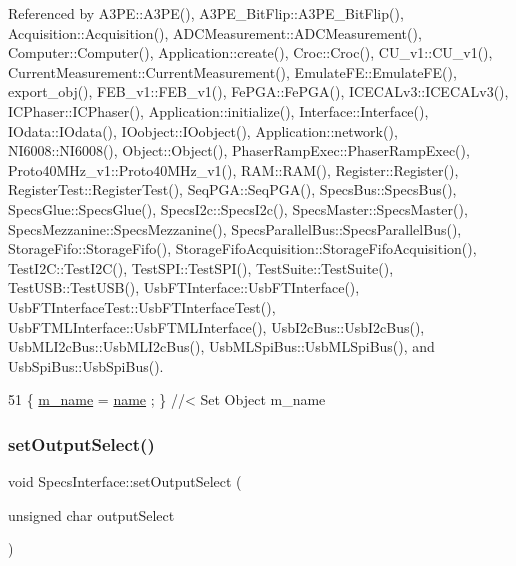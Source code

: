 Referenced by A3\+P\+E\+::\+A3\+P\+E(), A3\+P\+E\+\_\+\+Bit\+Flip\+::\+A3\+P\+E\+\_\+\+Bit\+Flip(), Acquisition\+::\+Acquisition(), A\+D\+C\+Measurement\+::\+A\+D\+C\+Measurement(), Computer\+::\+Computer(), Application\+::create(), Croc\+::\+Croc(), C\+U\+\_\+v1\+::\+C\+U\+\_\+v1(), Current\+Measurement\+::\+Current\+Measurement(), Emulate\+F\+E\+::\+Emulate\+F\+E(), export\+\_\+obj(), F\+E\+B\+\_\+v1\+::\+F\+E\+B\+\_\+v1(), Fe\+P\+G\+A\+::\+Fe\+P\+G\+A(), I\+C\+E\+C\+A\+Lv3\+::\+I\+C\+E\+C\+A\+Lv3(), I\+C\+Phaser\+::\+I\+C\+Phaser(), Application\+::initialize(), Interface\+::\+Interface(), I\+Odata\+::\+I\+Odata(), I\+Oobject\+::\+I\+Oobject(), Application\+::network(), N\+I6008\+::\+N\+I6008(), Object\+::\+Object(), Phaser\+Ramp\+Exec\+::\+Phaser\+Ramp\+Exec(), Proto40\+M\+Hz\+\_\+v1\+::\+Proto40\+M\+Hz\+\_\+v1(), R\+A\+M\+::\+R\+A\+M(), Register\+::\+Register(), Register\+Test\+::\+Register\+Test(), Seq\+P\+G\+A\+::\+Seq\+P\+G\+A(), Specs\+Bus\+::\+Specs\+Bus(), Specs\+Glue\+::\+Specs\+Glue(), Specs\+I2c\+::\+Specs\+I2c(), Specs\+Master\+::\+Specs\+Master(), Specs\+Mezzanine\+::\+Specs\+Mezzanine(), Specs\+Parallel\+Bus\+::\+Specs\+Parallel\+Bus(), Storage\+Fifo\+::\+Storage\+Fifo(), Storage\+Fifo\+Acquisition\+::\+Storage\+Fifo\+Acquisition(), Test\+I2\+C\+::\+Test\+I2\+C(), Test\+S\+P\+I\+::\+Test\+S\+P\+I(), Test\+Suite\+::\+Test\+Suite(), Test\+U\+S\+B\+::\+Test\+U\+S\+B(), Usb\+F\+T\+Interface\+::\+Usb\+F\+T\+Interface(), Usb\+F\+T\+Interface\+Test\+::\+Usb\+F\+T\+Interface\+Test(), Usb\+F\+T\+M\+L\+Interface\+::\+Usb\+F\+T\+M\+L\+Interface(), Usb\+I2c\+Bus\+::\+Usb\+I2c\+Bus(), Usb\+M\+L\+I2c\+Bus\+::\+Usb\+M\+L\+I2c\+Bus(), Usb\+M\+L\+Spi\+Bus\+::\+Usb\+M\+L\+Spi\+Bus(), and Usb\+Spi\+Bus\+::\+Usb\+Spi\+Bus().


\begin{DoxyCode}
51 \{ \hyperlink{classObject_a8b83c95c705d2c3ba0d081fe1710f48d}{m\_name}  = \hyperlink{classObject_a300f4c05dd468c7bb8b3c968868443c1}{name}  ; \} \textcolor{comment}{//< Set Object m\_name}
\end{DoxyCode}
\mbox{\label{classSpecsInterface_a1907d360f2bda367cfb1d39e379c6493}} 
\subsubsection{\texorpdfstring{set\+Output\+Select()}{setOutputSelect()}}
{\footnotesize\ttfamily void Specs\+Interface\+::set\+Output\+Select (\begin{DoxyParamCaption}\item[{unsigned char}]{output\+Select }\end{DoxyParamCaption})}



